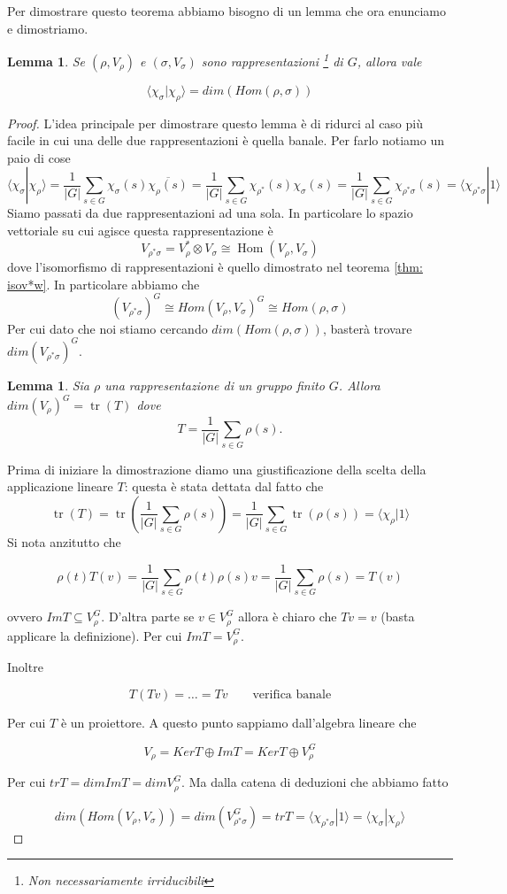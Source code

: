 \documentclass[11pt]{article}
\theoremstyle{plain}
\newtheorem{lemma}[thm]{Lemma}
\theoremstyle{definition}
\theoremstyle{remark}
\newcommand{\dsum}{\displaystyle\sum}
\DeclareMathOperator{\tr}{tr}
\DeclareMathOperator{\Hom}{Hom}
\begin{document}
Per dimostrare questo teorema abbiamo bisogno di un lemma che ora enunciamo e dimostriamo.




\begin{lemma}
Se $(\rho, V_\rho)$ e $(\sigma, V_\sigma)$ sono rappresentazioni \footnote{Non necessariamente irriducibili} di $G$, allora vale

\[ \langle \chi_\sigma | \chi_\rho \rangle  = dim(Hom (\rho, \sigma))\] 
\label{lemma relazioni ortogonalita}
\end{lemma}
\begin{proof}
L'idea principale per dimostrare questo lemma è di ridurci al caso più facile in cui una delle due rappresentazioni è quella banale. Per farlo notiamo un paio di cose
\[ \langle \chi_\sigma | \chi_\rho \rangle = \dfrac{1}{|G|} \dsum_{s\in G} \chi_\sigma(s) \overline{\chi_\rho(s)} = \dfrac{1}{|G|} \dsum_{s\in G} {\chi_{\rho^*}(s)} \chi_{\sigma}(s) = \dfrac{1}{|G|} \dsum_{s\in G} \chi_{\rho^*\sigma}(s)  = \langle \chi_{\rho^*\sigma}  | 1 \rangle\]
Siamo passati da due rappresentazioni ad una sola. In particolare lo spazio vettoriale su cui agisce questa rappresentazione è 
\[ V_{\rho^* \sigma} = V_{\rho}^* \otimes V_\sigma \cong \Hom(V_\rho, V_\sigma)\]
dove l'isomorfismo di rappresentazioni è quello dimostrato nel teorema \ref{thm: isov*w}.
In particolare abbiamo che
\[ (V_{\rho^*\sigma})^G \cong Hom(V_\rho, V_\sigma)^G \cong Hom(\rho, \sigma)\]
Per cui dato che noi stiamo cercando $dim(Hom(\rho, \sigma))$, basterà trovare $dim(V_{\rho^*\sigma})^G$.
\begin{lemma}
Sia $\rho$ una rappresentazione di un gruppo finito $G$. Allora
$dim(V_{\rho})^G=\tr(T)$ dove
\[ T = \dfrac{1}{|G|} \dsum_{s\in G} \rho(s).\]
\end{lemma}

Prima di iniziare la dimostrazione diamo una giustificazione della scelta della applicazione lineare $T$: questa è stata dettata dal fatto che
\[ \tr(T)=\tr(\dfrac{1}{|G|} \dsum_{s\in G} \rho(s))= \dfrac{1}{|G|} \dsum_{s\in G} \tr(\rho(s))= \langle \chi_\rho| 1 \rangle \]
Si nota anzitutto che 

\[ \rho(t) T(v) = \dfrac{1}{|G|} \dsum_{s\in G} \rho(t)\rho(s) v = \dfrac{1}{|G|} \dsum_{s\in G} \rho(s) = T(v)\]

ovvero $ImT\subseteq V_\rho^G$. D'altra parte se $v \in V_\rho^G$ allora è chiaro che $Tv = v$ (basta applicare la definizione). Per cui $ImT = V_\rho^G$. 

Inoltre 

\[T(Tv) = \ldots = Tv \qquad \text{verifica banale}\]

Per cui $T$ è un proiettore. A questo punto sappiamo dall'algebra lineare che

\[ V_\rho = Ker T \oplus Im T = Ker T \oplus V_\rho^G\]

Per cui $trT = dimImT = dimV_\rho^G$. Ma dalla catena di deduzioni che abbiamo fatto

\[dim(Hom(V_\rho, V_\sigma)) = dim(V_{\rho^*\sigma}^G) = trT = \langle \chi_{\rho^*\sigma} | 1 \rangle = \langle \chi_\sigma | \chi_\rho \rangle\]

\end{proof}
\end{document}

